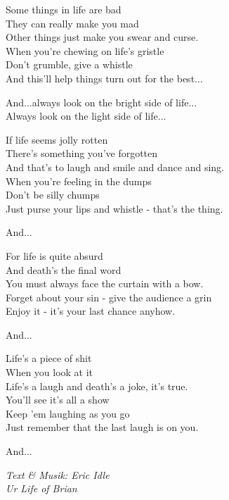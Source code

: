 \vspace{10pt}
Some things in life are bad\\
They can really make you mad\\
Other things just make you swear and curse.\\
When you're chewing on life's gristle\\
Don't grumble, give a whistle\\
And this'll help things turn out for the best...\par
\vspace{10pt}
And...always look on the bright side of life...\\
Always look on the light side of life...\par
\vspace{10pt}
If life seems jolly rotten\\
There's something you've forgotten\\
And that's to laugh and smile and dance and sing.\\
When you're feeling in the dumps\\
Don't be silly chumps\\
Just purse your lips and whistle - that's the thing.\par
\vspace{10pt}
And...\par
\vspace{10pt}
For life is quite absurd\\
And death's the final word\\
You must always face the curtain with a bow.\\
Forget about your sin - give the audience a grin\\
Enjoy it - it's your last chance anyhow.\par
\vspace{10pt}
And...\par
\newpage
Life's a piece of shit\\
When you look at it\\
Life's a laugh and death's a joke, it's true.\\
You'll see it's all a show\\
Keep 'em laughing as you go\\
Just remember that the last laugh is on you.\par
\vspace{10pt}
And...\par
\vspace{10pt}
{\footnotesize\textit{Text \& Musik: Eric Idle \\ Ur Life of Brian}}
